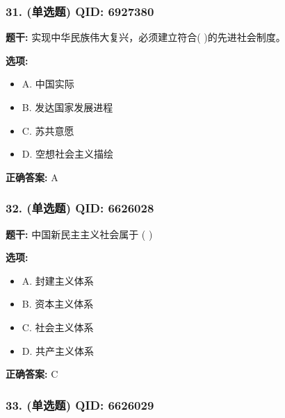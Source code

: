 \documentclass[12pt,UTF8]{ctexart}
\begin{document}
\subsubsection*{31. (单选题) \small QID: 6927380}

\textbf{题干:}
实现中华民族伟大复兴，必须建立符合(         )的先进社会制度。

\textbf{选项:}
\begin{itemize}[leftmargin=*]

  \item A. 中国实际

  \item B. 发达国家发展进程

  \item C. 苏共意愿

  \item D. 空想社会主义描绘

\end{itemize}

\textbf{正确答案:}
A

\vspace{0.3em}\hrulefill\vspace{0.7em}

\subsubsection*{32. (单选题) \small QID: 6626028}

\textbf{题干:}
中国新民主主义社会属于  ( )

\textbf{选项:}
\begin{itemize}[leftmargin=*]

  \item A. 封建主义体系

  \item B. 资本主义体系

  \item C. 社会主义体系

  \item D. 共产主义体系

\end{itemize}

\textbf{正确答案:}
C

\vspace{0.3em}\hrulefill\vspace{0.7em}

\subsubsection*{33. (单选题) \small QID: 6626029}
\end{document}

